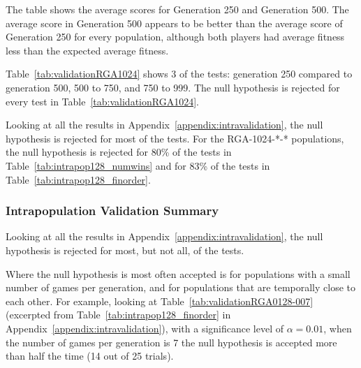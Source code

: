 The table shows the average scores for Generation 250 and Generation 500. The
average score in Generation 500 appears to be better than the average score of
Generation 250 for every population, although both players had average fitness
less than the expected average fitness.

Table~\ref{tab:validationRGA1024} shows 3 of the tests: generation 250 compared
to generation 500, 500 to 750, and 750 to 999. The null hypothesis is rejected
for every test in Table~\ref{tab:validationRGA1024}. 

Looking at all the results in Appendix~\ref{appendix:intravalidation}, 
the null hypothesis is rejected for most of the tests. For the RGA-1024-*-*
populations, the null hypothesis is rejected for 80\% of the tests in
Table~\ref{tab:intrapop128_numwins} and for 83\% of the tests in
Table~\ref{tab:intrapop128_finorder}.

\subsubsection{Intrapopulation Validation Summary}

Looking at all the results in Appendix~\ref{appendix:intravalidation}, 
the null hypothesis is rejected for most, but not all, of the tests.

Where the null hypothesis is most often accepted is for populations with a small
number of games per generation, and for populations that are temporally close to
each other. For example, looking at Table~\ref{tab:validationRGA0128-007}
(excerpted from Table~\ref{tab:intrapop128_finorder} in
Appendix~\ref{appendix:intravalidation}), with a significance level of
\(\alpha=0.01\), when the number of games per generation is 7 the null
hypothesis is accepted more than half the time (14 out of 25 trials).

